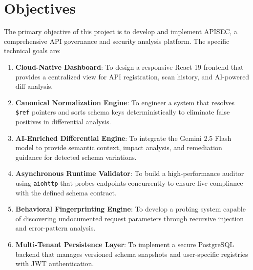 \documentclass{fisatprojectfinal}
\begin{document}
\section{Objectives}
The primary objective of this project is to develop and implement APISEC, a comprehensive API governance and security analysis platform. The specific technical goals are:
\begin{enumerate}
    \item \textbf{Cloud-Native Dashboard}: To design a responsive React 19 frontend that provides a centralized view for API registration, scan history, and AI-powered diff analysis.
    \item \textbf{Canonical Normalization Engine}: To engineer a system that resolves \texttt{\$ref} pointers and sorts schema keys deterministically to eliminate false positives in differential analysis.
    \item \textbf{AI-Enriched Differential Engine}: To integrate the Gemini 2.5 Flash model to provide semantic context, impact analysis, and remediation guidance for detected schema variations.
    \item \textbf{Asynchronous Runtime Validator}: To build a high-performance auditor using \texttt{aiohttp} that probes endpoints concurrently to ensure live compliance with the defined schema contract.
    \item \textbf{Behavioral Fingerprinting Engine}: To develop a probing system capable of discovering undocumented request parameters through recursive injection and error-pattern analysis.
    \item \textbf{Multi-Tenant Persistence Layer}: To implement a secure PostgreSQL backend that manages versioned schema snapshots and user-specific registries with JWT authentication.
\end{enumerate}
\end{document}
